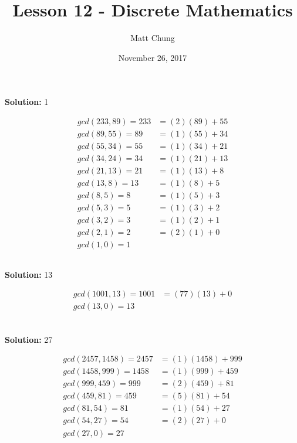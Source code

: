 \documentclass{article}
\title{Lesson 12 - Discrete Mathematics}
\author{Matt Chung}
\date{November 26, 2017}
\begin{document}
\maketitle

\section{}

\subsection{}
\textbf{Solution: } 1

\begin{align*}
   gcd(233,89) = 233 &= (2)(89) + 55 \\
   gcd(89, 55) = 89 &= (1)(55) + 34 \\
   gcd(55, 34) = 55 &= (1)(34) + 21 \\
   gcd(34, 24) = 34 &= (1)(21) + 13 \\
   gcd(21, 13) = 21 &= (1)(13) + 8 \\
   gcd(13, 8) = 13 &= (1)(8) + 5 \\
   gcd(8, 5) = 8 &= (1)(5) + 3 \\
   gcd(5, 3) = 5 &= (1)(3) + 2 \\
   gcd(3, 2) = 3 &= (1)(2) + 1 \\
   gcd(2, 1) = 2 &= (2)(1) + 0 \\
   gcd(1, 0) = 1 
\end{align*}

\subsection{}
\textbf{Solution: } 13

\begin{align*}
   gcd(1001, 13) = 1001 &= (77)(13) + 0 \\
   gcd(13,0) = 13 \\
\end{align*}   

\subsection{}
\textbf{Solution: } 27

\begin{align*}
   gcd(2457, 1458) = 2457 &= (1)(1458) + 999 \\
   gcd(1458, 999) = 1458 &= (1)(999) + 459 \\
   gcd(999, 459) = 999 &= (2)(459) + 81 \\
   gcd(459, 81) = 459 &= (5)(81) + 54 \\
   gcd(81, 54) = 81 &= (1)(54) + 27 \\
   gcd(54, 27) = 54 &= (2)(27) + 0 \\
   gcd(27, 0) = 27
\end{align*}
\end{document}
